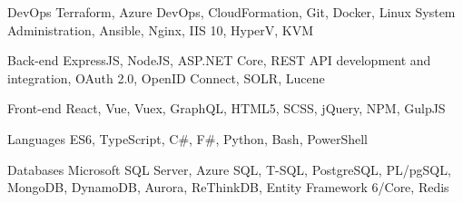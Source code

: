 

\begin{cvskills}

  \cvskill
    {DevOps} %
    {Terraform, Azure DevOps, CloudFormation, Git, Docker, Linux System Administration, Ansible, Nginx, IIS 10, HyperV, KVM} %

  \cvskill
    {Back-end} %
    {ExpressJS, NodeJS, ASP.NET Core, REST API development and integration, OAuth 2.0,  OpenID Connect, SOLR, Lucene} %

  \cvskill
    {Front-end} %
    {React, Vue, Vuex, GraphQL, HTML5, SCSS, jQuery, NPM, GulpJS} %

  \cvskill
    {Languages} %
    {ES6, TypeScript, C\#, F\#, Python, Bash, PowerShell} %

  \cvskill
    {Databases} %
    {Microsoft SQL Server, Azure SQL, T-SQL, PostgreSQL, PL/pgSQL, MongoDB, DynamoDB, Aurora, ReThinkDB, Entity Framework 6/Core, Redis} %




\end{cvskills}
